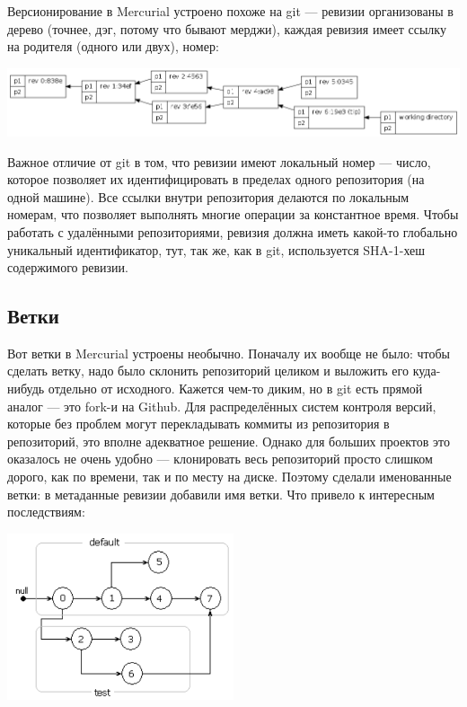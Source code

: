 \documentclass[a5paper]{article}
\begin{document}
Версионирование в Mercurial устроено похоже на git --- ревизии организованы в дерево (точнее, дэг, потому что бывают мерджи), каждая ревизия имеет ссылку на родителя (одного или двух), номер:

\begin{center}
    \includegraphics[width=\textwidth]{mercurialRevisions.png}
\end{center}

Важное отличие от git в том, что ревизии имеют локальный номер --- число, которое позволяет их идентифицировать в пределах одного репозитория (на одной машине). Все ссылки внутри репозитория делаются по локальным номерам, что позволяет выполнять многие операции за константное время. Чтобы работать с удалёнными репозиториями, ревизия должна иметь какой-то глобально уникальный идентификатор, тут, так же, как в git, используется SHA-1-хеш содержимого ревизии.

\subsection{Ветки}

Вот ветки в Mercurial устроены необычно. Поначалу их вообще не было: чтобы сделать ветку, надо было склонить репозиторий целиком и выложить его куда-нибудь отдельно от исходного. Кажется чем-то диким, но в git есть прямой аналог --- это fork-и на Github. Для распределённых систем контроля версий, которые без проблем могут перекладывать коммиты из репозитория в репозиторий, это вполне адекватное решение. Однако для больших проектов это оказалось не очень удобно --- клонировать весь репозиторий просто слишком дорого, как по времени, так и по месту на диске. Поэтому сделали именованные ветки: в метаданные ревизии добавили имя ветки. Что привело к интересным последствиям:

\begin{center}
    \includegraphics[width=0.5\textwidth]{mercurialBranches.png}
\end{center}
\end{document}
